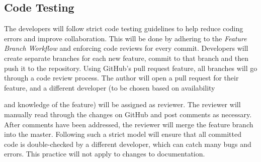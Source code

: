 \documentclass[12pt]{article}
\newcommand{\todo}[1]{\textcolor{red}{[TODO: #1]}} \else
\newcommand{\authornote}[3]{} \newcommand{\todo}[1]{} \fi
\newcommand{\ds}[1]{\authornote{blue}{DS}{#1}}
\newcommand{\mmp}[1]{\authornote{green}{MP}{#1}}
\newcounter{TestCounter}
\begin{document}
%
%
%
%


\subsection{Code Testing} %
The developers will follow strict code testing guidelines to help reduce coding errors and improve collaboration. This will be done by adhering to the \emph{Feature Branch Workflow} and enforcing code reviews for every commit. Developers will create separate branches for each new feature, commit to that branch and then push it to the repository. Using GitHub's pull request feature, all branches will go through a code review process. The author will open a pull request for their feature, and a different developer (to be chosen based on availability
\ds{``availability"}\mmp{fixed spelling mistake}
and knowledge of the feature) will be assigned as reviewer. The reviewer will manually read through the changes on GitHub and post comments as necessary. After comments have been addressed, the reviewer will merge the feature branch into the master. Following such a strict model will ensure that all committed code is double-checked by a different developer, which can catch many bugs and errors. This practice will not apply to changes to documentation.
\end{document}

